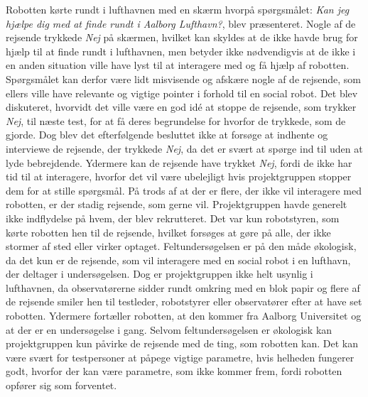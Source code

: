 Robotten kørte rundt i lufthavnen med en skærm hvorpå spørgsmålet: \textit{Kan jeg hjælpe dig med at finde rundt i Aalborg Lufthavn?}, blev præsenteret. Nogle af de rejsende trykkede \textit{Nej} på skærmen, hvilket kan skyldes at de ikke havde brug for hjælp til at finde rundt i lufthavnen, men betyder ikke nødvendigvis at de ikke i en anden situation ville have lyst til at interagere med og få hjælp af robotten. Spørgsmålet kan derfor være lidt misvisende og afskære nogle af de rejsende, som ellers ville have relevante og vigtige pointer i forhold til en social robot. Det blev diskuteret, hvorvidt det ville være en god idé at stoppe de rejsende, som trykker \textit{Nej}, til næste test, for at få deres begrundelse for hvorfor de trykkede, som de gjorde. Dog blev det efterfølgende besluttet ikke at forsøge at indhente og interviewe de rejsende, der trykkede \textit{Nej}, da det er svært at spørge ind til uden at lyde bebrejdende. Ydermere kan de rejsende have trykket \textit{Nej}, fordi de ikke har tid til at interagere, hvorfor det vil være ubelejligt hvis projektgruppen stopper dem for at stille spørgsmål.\blankline
%
På trods af at der er flere, der ikke vil interagere med robotten, er der stadig rejsende, som gerne vil. Projektgruppen havde generelt ikke indflydelse på hvem, der blev rekrutteret. Det var kun robotstyren, som kørte robotten hen til de rejsende, hvilket forsøges at gøre på alle, der ikke stormer af sted eller virker optaget. Feltundersøgelsen er på den måde økologisk, da det kun er de rejsende, som vil interagere med en social robot i en lufthavn, der deltager i undersøgelsen. Dog er projektgruppen ikke helt usynlig i lufthavnen, da observatørerne sidder rundt omkring med en blok papir og flere af de rejsende smiler hen til testleder, robotstyrer eller observatører efter at have set robotten. Ydermere fortæller robotten, at den kommer fra Aalborg Universitet og at der er en undersøgelse i gang.\blankline
%
Selvom feltundersøgelsen er økologisk kan projektgruppen kun påvirke de rejsende med de ting, som robotten kan. Det kan være svært for testpersoner at påpege vigtige parametre, hvis helheden fungerer godt, hvorfor der kan være parametre, som ikke kommer frem, fordi robotten opfører sig som forventet.

